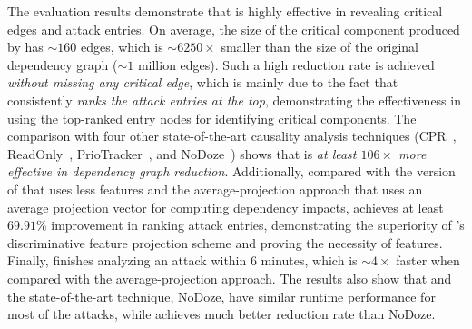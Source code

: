 The evaluation results demonstrate that \tool is highly effective in revealing critical edges and attack entries. On average, the size of the critical component produced by \tool has $\sim160$ edges, which is $\sim6250\times$ smaller than the size of the original dependency graph ($\sim1$ million edges). %
Such a high reduction rate is achieved \textit{without missing any critical edge}, which is mainly due to the fact that \tool consistently \textit{ranks the attack entries at the top},
demonstrating the effectiveness in using the top-ranked entry nodes for identifying critical components. 
The comparison with four other state-of-the-art causality analysis techniques (CPR~\cite{reduction}, ReadOnly~\cite{loggc}, PrioTracker~\cite{liu2018priotracker}, and NoDoze~\cite{hassan2019nodoze}) shows that \tool is \textit{at least $106\times$ more effective in dependency graph reduction}. 
Additionally, compared with the version of \tool that uses less features and the average-projection approach that uses an average projection vector for computing dependency impacts, \tool achieves at least $69.91\%$ improvement in ranking attack entries, demonstrating the superiority of \tool's discriminative feature projection scheme and proving the necessity of features.
Finally, \tool finishes analyzing an attack within $6$ minutes, which is $\sim4\times$ faster when compared with the average-projection approach.
The results also show that \tool and the state-of-the-art technique, NoDoze, have similar runtime performance for most of the attacks, while \tool achieves much better reduction rate than NoDoze.



% 
% 


